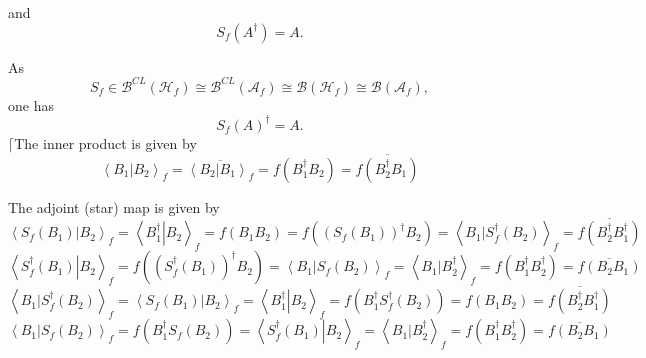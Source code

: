 \documentclass[aps,preprint]{revtex4}%
\begin{document}
and
\begin{equation}
S_{f}\left(  A^{\dagger}\right)  =A.
\end{equation}


As
\begin{equation}
S_{f}\in\mathcal{B}^{CL}\left(  \mathcal{H}_{f}\right)  \cong\mathcal{B}%
^{CL}\left(  \mathcal{A}_{f}\right)  \cong\mathcal{B}\left(  \mathcal{H}%
_{f}\right)  \cong\mathcal{B}\left(  \mathcal{A}_{f}\right)  ,
\end{equation}
one has
\begin{equation}
S_{f}\left(  A\right)  ^{\dagger}=A.
\end{equation}
$\lceil$The inner product is given by
\begin{equation}
\left\langle \left.  B_{1}\right\vert B_{2}\right\rangle _{f}=\overline
{\left\langle \left.  B_{2}\right\vert B_{1}\right\rangle _{f}}=f\left(
B_{1}^{\dagger}B_{2}\right)  =\overline{f\left(  B_{2}^{\dagger}B_{1}\right)
}%
\end{equation}


\bigskip

The adjoint (star) map is given by
\begin{equation}
\left\langle \left.  S_{f}\left(  B_{1}\right)  \right\vert B_{2}\right\rangle
_{f}=\left\langle \left.  B_{1}^{\dagger}\right\vert B_{2}\right\rangle
_{f}=f\left(  B_{1}B_{2}\right)  =f\left(  \left(  S_{f}\left(  B_{1}\right)
\right)  ^{\dagger}B_{2}\right)  =\left\langle \left.  B_{1}\right\vert
S_{f}^{\dagger}\left(  B_{2}\right)  \right\rangle _{f}=\overline{f\left(
B_{2}^{\dagger}B_{1}^{\dagger}\right)  }%
\end{equation}%
\begin{equation}
\left\langle \left.  S_{f}^{\dagger}\left(  B_{1}\right)  \right\vert
B_{2}\right\rangle _{f}=f\left(  \left(  S_{f}^{\dagger}\left(  B_{1}\right)
\right)  ^{\dagger}B_{2}\right)  =\left\langle \left.  B_{1}\right\vert
S_{f}\left(  B_{2}\right)  \right\rangle _{f}=\left\langle \left.
B_{1}\right\vert B_{2}^{\dagger}\right\rangle _{f}=f\left(  B_{1}^{\dagger
}B_{2}^{\dagger}\right)  =\overline{f\left(  B_{2}B_{1}\right)  }%
\end{equation}%
\begin{equation}
\left\langle \left.  B_{1}\right\vert S_{f}^{\dagger}\left(  B_{2}\right)
\right\rangle _{f}=\left\langle \left.  S_{f}\left(  B_{1}\right)  \right\vert
B_{2}\right\rangle _{f}=\left\langle \left.  B_{1}^{\dagger}\right\vert
B_{2}\right\rangle _{f}=f\left(  B_{1}^{\dagger}S_{f}^{\dagger}\left(
B_{2}\right)  \right)  =f\left(  B_{1}B_{2}\right)  =\overline{f\left(
B_{2}^{\dagger}B_{1}^{\dagger}\right)  }%
\end{equation}%
\begin{equation}
\left\langle \left.  B_{1}\right\vert S_{f}\left(  B_{2}\right)  \right\rangle
_{f}=f\left(  B_{1}^{\dagger}S_{f}\left(  B_{2}\right)  \right)  =\left\langle
\left.  S_{f}^{\dagger}\left(  B_{1}\right)  \right\vert B_{2}\right\rangle
_{f}=\left\langle \left.  B_{1}\right\vert B_{2}^{\dagger}\right\rangle
_{f}=f\left(  B_{1}^{\dagger}B_{2}^{\dagger}\right)  =\overline{f\left(
B_{2}B_{1}\right)  }%
\end{equation}
\end{document}
